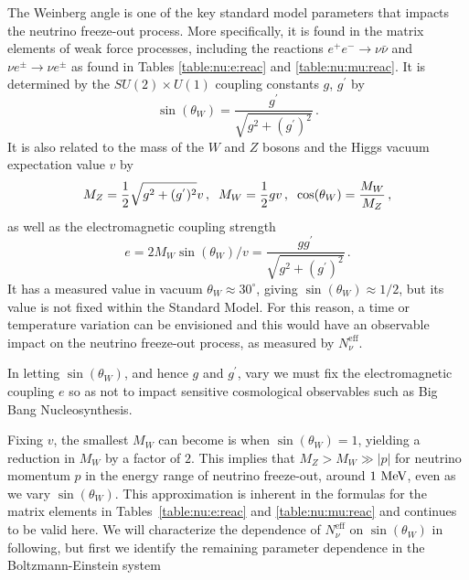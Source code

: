 The Weinberg angle is one of the key standard model parameters that impacts the neutrino freeze-out process. More specifically, it is found in the matrix elements of weak force processes, including the reactions $e^+e^-\rightarrow \nu\bar\nu$ and $\nu e^\pm\rightarrow \nu e^\pm$ as found in Tables \ref{table:nu:e:reac} and \ref{table:nu:mu:reac}. It is determined by the $SU(2)\times U(1)$ coupling constants $g$, $g^{'}$ by
\begin{equation}
\sin(\theta_W)=\frac{g^{'}}{\sqrt{g^2+(g^{'})^2}}\,.
\end{equation}
It is also related to the mass of the $W$ and $Z$ bosons and the Higgs vacuum expectation value $v$ by
\begin{equation}
M_Z=\frac{1}{2}\sqrt{g^2+(g^{'})^2}v\,,\hspace{2mm} M_W=\frac{1}{2}gv\,,\hspace{2mm} \cos(\theta_W)=\frac{M_W}{M_Z}\,,
\end{equation}
as well as the electromagnetic coupling strength
\begin{equation}
e=2M_W\sin(\theta_W)/v=\frac{gg^{'}}{\sqrt{g^2+(g^{'})^2}}\,.
\end{equation}
It has a measured value in vacuum $\theta_W\approx 30^\circ$, giving $\sin(\theta_W)\approx 1/2$, but its value is not fixed within the Standard Model. For this reason, a time or temperature variation can be envisioned and this would have an observable impact on the neutrino freeze-out process, as measured by $N_\nu^{\mathrm{eff}}$.

In letting $\sin(\theta_W)$, and hence $g$ and $g^{'}$, vary we must fix the electromagnetic coupling $e$ so as not to impact sensitive cosmological observables such as Big Bang Nucleosynthesis. 

Fixing $v$, the smallest $M_W$ can become is when $\sin(\theta_W)=1$, yielding a reduction in $M_W$ by a factor of $2$. This implies that $M_Z>M_W\gg |p|$ for neutrino momentum $p$ in the energy range of neutrino freeze-out, around $1\text{ MeV}$, even as we vary $\sin(\theta_W)$. This approximation is inherent in the formulas for the matrix elements in Tables~\ref{table:nu:e:reac} and \ref{table:nu:mu:reac} and continues to be valid here. We will characterize the dependence of $N_\nu^{\mathrm{eff}}$ on $\sin(\theta_W)$ in following, but first we identify the remaining parameter dependence in the Boltzmann-Einstein system

